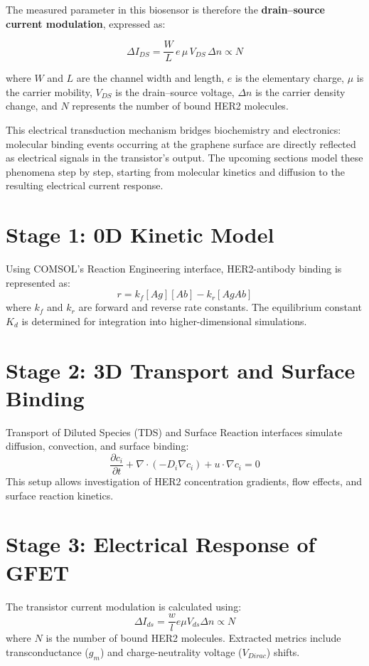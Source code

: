 \documentclass[12pt,a4paper]{report}
\begin{document}
The measured parameter in this biosensor is therefore the \textbf{drain–source current modulation}, expressed as:

\begin{equation}
\Delta I_{DS} = \frac{W}{L}\, e\, \mu\, V_{DS}\, \Delta n \propto N
\end{equation}

where $W$ and $L$ are the channel width and length, $e$ is the elementary charge, $\mu$ is the carrier mobility, $V_{DS}$ is the drain–source voltage, $\Delta n$ is the carrier density change, and $N$ represents the number of bound HER2 molecules.

This electrical transduction mechanism bridges biochemistry and electronics: molecular binding events occurring at the graphene surface are directly reflected as electrical signals in the transistor’s output. The upcoming sections model these phenomena step by step, starting from molecular kinetics and diffusion to the resulting electrical current response.

\section{Stage 1: 0D Kinetic Model}
Using COMSOL's Reaction Engineering interface, HER2-antibody binding is represented as:
\[
  r = k_f[Ag][Ab] - k_r[AgAb]
\]
where $k_f$ and $k_r$ are forward and reverse rate constants. The equilibrium constant $K_d$ is determined for integration into higher-dimensional simulations.

\section{Stage 2: 3D Transport and Surface Binding}
Transport of Diluted Species (TDS) and Surface Reaction interfaces simulate diffusion, convection, and surface binding:
\[
  \frac{\partial c_i}{\partial t} + \nabla \cdot (-D_i \nabla c_i) + u \cdot \nabla c_i = 0
\]
This setup allows investigation of HER2 concentration gradients, flow effects, and surface reaction kinetics.

\section{Stage 3: Electrical Response of GFET}
The transistor current modulation is calculated using:
\[
  \Delta I_{ds} = \frac{w}{l} e \mu V_{ds} \Delta n \propto N
\]
where $N$ is the number of bound HER2 molecules. Extracted metrics include transconductance ($g_m$) and charge-neutrality voltage ($V_{Dirac}$) shifts.
\end{document}
